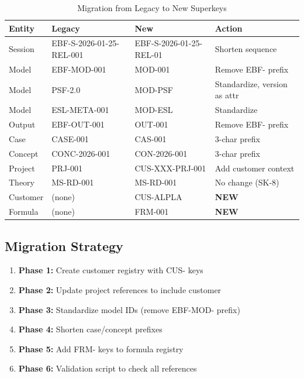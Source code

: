 \begin{table}[htbp]
\centering
\caption{Migration from Legacy to New Superkeys}
\label{tab:superkey-migration}
\renewcommand{\arraystretch}{1.3}
\begin{tabular}{@{}llll@{}}
\toprule
\textbf{Entity} & \textbf{Legacy} & \textbf{New} & \textbf{Action} \\
\midrule
Session & EBF-S-2026-01-25-REL-001 & EBF-S-2026-01-25-REL-01 & Shorten sequence \\
Model & EBF-MOD-001 & MOD-001 & Remove EBF- prefix \\
Model & PSF-2.0 & MOD-PSF & Standardize, version as attr \\
Model & ESL-META-001 & MOD-ESL & Standardize \\
Output & EBF-OUT-001 & OUT-001 & Remove EBF- prefix \\
Case & CASE-001 & CAS-001 & 3-char prefix \\
Concept & CONC-2026-001 & CON-2026-001 & 3-char prefix \\
Project & PRJ-001 & CUS-XXX-PRJ-001 & Add customer context \\
Theory & MS-RD-001 & MS-RD-001 & No change (SK-8) \\
Customer & (none) & CUS-ALPLA & \textbf{NEW} \\
Formula & (none) & FRM-001 & \textbf{NEW} \\
\bottomrule
\end{tabular}
\end{table}

\subsection{Migration Strategy}

\begin{enumerate}
    \item \textbf{Phase 1:} Create customer registry with CUS- keys
    \item \textbf{Phase 2:} Update project references to include customer
    \item \textbf{Phase 3:} Standardize model IDs (remove EBF-MOD- prefix)
    \item \textbf{Phase 4:} Shorten case/concept prefixes
    \item \textbf{Phase 5:} Add FRM- keys to formula registry
    \item \textbf{Phase 6:} Validation script to check all references
\end{enumerate}


